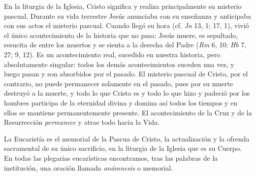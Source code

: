 \begin{ccebody}
 En la liturgia de la Iglesia, Cristo significa y realiza principalmente su misterio pascual. Durante su vida terrestre Jesús anunciaba con su enseñanza y anticipaba con sus actos el misterio pascual. Cuando llegó su hora (cf. \textit{Jn} 13, 1; 17, 1), vivió el único acontecimiento de la historia que no pasa: Jesús muere, es sepultado, resucita de entre los muertos y se sienta a la derecha del Padre  (\textit{Rm} 6, 10; \textit{Hb} 7, 27; 9, 12). Es un acontecimiento real, sucedido en nuestra historia, pero absolutamente singular: todos los demás acontecimientos suceden una vez, y luego pasan y son absorbidos por el pasado. El misterio pascual de Cristo, por el contrario, no puede permanecer solamente en el pasado, pues por su muerte destruyó a la muerte, y todo lo que Cristo es y todo lo que hizo y padeció por los hombres participa de la eternidad divina y domina así todos los tiempos y en ellos se mantiene permanentemente presente. El acontecimiento de la Cruz y de la Resurrección \textit{permanece} y atrae todo hacia la Vida.


 La Eucaristía es el memorial de la Pascua de Cristo, la actualización y la ofrenda sacramental de su único sacrificio, en la liturgia de la Iglesia que es su Cuerpo. En todas las plegarias eucarísticas encontramos, tras las palabras de la institución, una oración llamada \textit{anámnesis} o memorial.
\end{ccebody}

